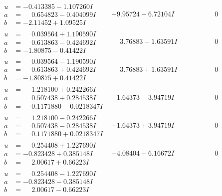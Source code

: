 \documentclass[1p]{elsarticle_modified}
\theoremstyle{definition}
\begin{document}
$$\begin{array}{c|c|c}
\begin{aligned}
u &= -0.413385 - 1.107260 I \\
a &= \phantom{-}0.654823 - 0.404099 I \\
b &= -2.11452 + 1.09525 I\end{aligned}
 & -9.95724 - 6.72104 I & \phantom{-0.000000 } 0 \\ \hline\begin{aligned}
u &= \phantom{-}0.039564 + 1.190590 I \\
a &= \phantom{-}0.613863 - 0.424692 I \\
b &= -1.80875 - 0.41422 I\end{aligned}
 & \phantom{-}3.76883 - 1.63591 I & \phantom{-0.000000 } 0 \\ \hline\begin{aligned}
u &= \phantom{-}0.039564 - 1.190590 I \\
a &= \phantom{-}0.613863 + 0.424692 I \\
b &= -1.80875 + 0.41422 I\end{aligned}
 & \phantom{-}3.76883 + 1.63591 I & \phantom{-0.000000 } 0 \\ \hline\begin{aligned}
u &= \phantom{-}1.218100 + 0.242266 I \\
a &= \phantom{-}0.507438 + 0.284538 I \\
b &= \phantom{-}0.1171880 - 0.0218347 I\end{aligned}
 & -1.64373 - 3.94719 I & \phantom{-0.000000 } 0 \\ \hline\begin{aligned}
u &= \phantom{-}1.218100 - 0.242266 I \\
a &= \phantom{-}0.507438 - 0.284538 I \\
b &= \phantom{-}0.1171880 + 0.0218347 I\end{aligned}
 & -1.64373 + 3.94719 I & \phantom{-0.000000 } 0 \\ \hline\begin{aligned}
u &= \phantom{-}0.254408 + 1.227690 I \\
a &= -0.823428 + 0.385148 I \\
b &= \phantom{-}2.00617 + 0.66223 I\end{aligned}
 & -4.08404 - 6.16672 I & \phantom{-0.000000 } 0 \\ \hline\begin{aligned}
u &= \phantom{-}0.254408 - 1.227690 I \\
a &= -0.823428 - 0.385148 I \\
b &= \phantom{-}2.00617 - 0.66223 I\end{aligned}

\end{array}$$
\end{document}
